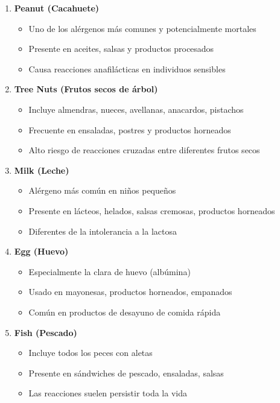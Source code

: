 \documentclass[12pt,a4paper]{article}
\begin{document}
\begin{enumerate}
    \item \textbf{Peanut (Cacahuete)}
    \begin{itemize}
        \item Uno de los alérgenos más comunes y potencialmente mortales
        \item Presente en aceites, salsas y productos procesados
        \item Causa reacciones anafilácticas en individuos sensibles
    \end{itemize}
    
    \item \textbf{Tree Nuts (Frutos secos de árbol)}
    \begin{itemize}
        \item Incluye almendras, nueces, avellanas, anacardos, pistachos
        \item Frecuente en ensaladas, postres y productos horneados
        \item Alto riesgo de reacciones cruzadas entre diferentes frutos secos
    \end{itemize}
    
    \item \textbf{Milk (Leche)}
    \begin{itemize}
        \item Alérgeno más común en niños pequeños
        \item Presente en lácteos, helados, salsas cremosas, productos horneados
        \item Diferentes de la intolerancia a la lactosa
    \end{itemize}
    
    \item \textbf{Egg (Huevo)}
    \begin{itemize}
        \item Especialmente la clara de huevo (albúmina)
        \item Usado en mayonesas, productos horneados, empanados
        \item Común en productos de desayuno de comida rápida
    \end{itemize}
    
    \item \textbf{Fish (Pescado)}
    \begin{itemize}
        \item Incluye todos los peces con aletas
        \item Presente en sándwiches de pescado, ensaladas, salsas
        \item Las reacciones suelen persistir toda la vida
    \end{itemize}
    

\end{enumerate}
\end{document}
